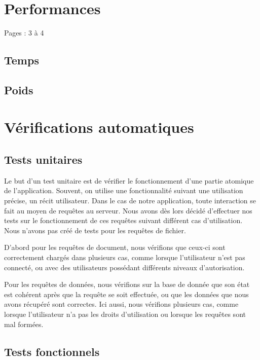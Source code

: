 \documentclass{EPL-master-thesis-covers-FR}
\begin{document}
		\section{Performances}

			Pages : 3 à 4

			\subsection*{Temps}
			\subsection*{Poids}

		\section{Vérifications automatiques}

			\subsection*{Tests unitaires}

				Le but d'un test unitaire est de vérifier le fonctionnement d'une partie atomique de l'application. Souvent, on utilise une fonctionnalité suivant une utilisation précise, un récit utilisateur. Dans le cas de notre application, toute interaction se fait au moyen de requêtes au serveur. Nous avons dès lors décidé d'effectuer nos tests sur le fonctionnement de ces requêtes suivant différent cas d'utilisation. Nous n'avons pas créé de tests pour les requêtes de fichier.

				D'abord pour les requêtes de document, nous vérifions que ceux-ci sont correctement chargés dans plusieurs cas, comme lorsque l'utilisateur n'est pas connecté, ou avec des utilisateurs possédant différents niveaux d'autorisation.

				Pour les requêtes de données, nous vérifions sur la base de donnée que son état est cohérent après que la requête se soit effectuée, ou que les données que nous avons récupéré sont correctes. Ici aussi, nous vérifions plusieurs cas, comme lorsque l'utilisateur n'a pas les droits d'utilisation ou lorsque les requêtes sont mal formées.

			\subsection*{Tests fonctionnels} %
\end{document}

